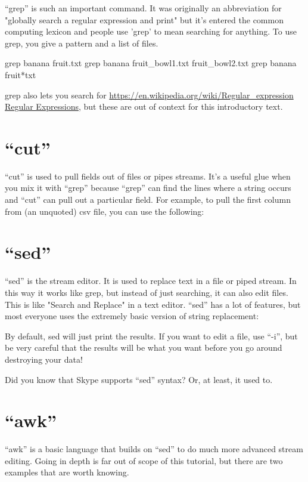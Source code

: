 ``grep'' is such an important command. It was originally an abbreviation for
"globally search a regular expression and print" but it's entered the common
computing lexicon and people use 'grep' to mean searching for anything. To use
grep, you give a pattern and a list of files. 

\begin{prompt}
grep banana fruit.txt
grep banana fruit_bowl1.txt fruit_bowl2.txt
grep banana fruit*txt
\end{prompt}

grep also lets you search for
\url{https://en.wikipedia.org/wiki/Regular_expression Regular Expressions}, but
these are out of context for this introductory text.

\section{``cut''} ``cut'' is used to pull fields out of files or pipes streams.
It's a useful glue when you mix it with ``grep'' because ``grep'' can find the
lines where a string occurs and ``cut'' can pull out a particular field. For
example, to pull the first column from (an unquoted) csv file, you can use the
following:

\begin{prompt}
\end{prompt}

\section{``sed''} ``sed'' is the stream editor. It is used to replace text in a
file or piped stream. In this way it works like grep, but instead of just
searching, it can also edit files. This is like "Search and Replace" in a text
editor. ``sed'' has a lot of features, but most everyone uses the extremely
basic version of string replacement:

\begin{prompt}
\end{prompt}

By default, sed will just print the results. If you want to edit a file, use
``-i'', but be very careful that the results will be what you want before you go
around destroying your data!

Did you know that Skype supports ``sed'' syntax? Or, at least, it used to.

\section{``awk''}
``awk'' is a basic language that builds on ``sed'' to do much more advanced
stream editing. Going in depth is far out of scope of this tutorial, but there
are two examples that are worth knowing.


